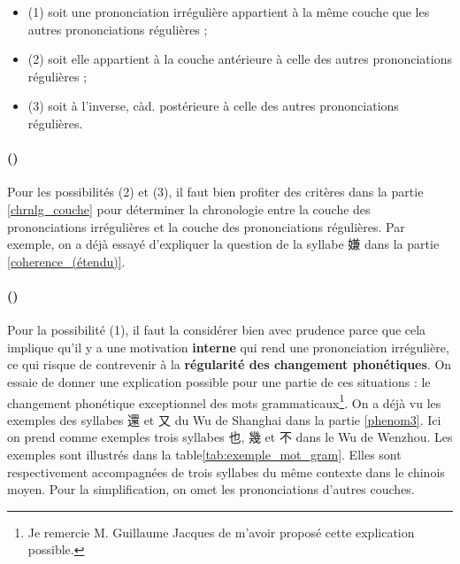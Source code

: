 \documentclass{scrbook}
\newcounter{c}[subsubsection]
\newcommand{\stpc}[1]{\stepcounter{#1}}
\newcommand{\illustre}{Les exemples sont illustrés dans la table\xspace}
\begin{document}
\begin{sloppypar}
\begin{itemize}
\item{(1) soit une prononciation irrégulière appartient à la même couche que les autres prononciations régulières ; }

\item{(2) soit elle appartient à la couche antérieure à celle des autres prononciations régulières ; }

\item{(3) soit à l'inverse, càd. postérieure à celle des autres prononciations régulières. }
\end{itemize}

\stpc{c}\paragraph{()}
Pour les possibilités (2) et (3), il faut bien profiter des critères dans la partie \ref{chrnlg_couche} pour déterminer la chronologie entre la couche des prononciations irrégulières et la couche des prononciations régulières. Par exemple, on a déjà essayé d'expliquer la question de la syllabe 嫌 dans la partie \ref{coherence_(étendu)}. 

\stpc{c}\paragraph{()}
Pour la possibilité (1), il faut la considérer bien avec prudence parce que cela implique qu'il y a une motivation \textbf{interne} qui rend une prononciation irrégulière, ce qui risque de contrevenir à la \textbf{régularité des changement phonétiques}. On essaie de donner une explication possible pour une partie de ces situations : le changement phonétique exceptionnel des mots grammaticaux\footnote{Je remercie M. Guillaume Jacques de m'avoir proposé cette explication possible.}. On a déjà vu les exemples des syllabes 還 et 又 du Wu de Shanghai dans la partie \ref{phenom3}. Ici on prend comme exemples trois syllabes 也, 幾 et 不 dans le Wu de Wenzhou. \illustre \ref{tab:exemple_mot_gram}. Elles sont respectivement accompagnées de trois syllabes du même contexte dans le chinois moyen. Pour la simplification, on omet les prononciations d'autres couches.


\end{sloppypar}
\end{document}
